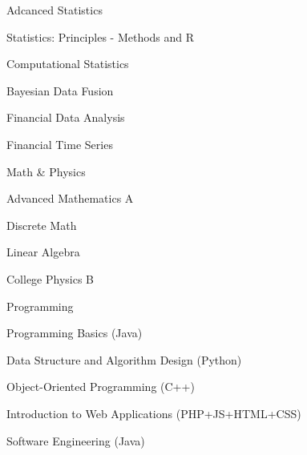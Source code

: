 \begin{cventries}
\cventry
  {Adcanced Statistics} %
  {} %
  {} %
  {} %
  {
    \begin{cvitems} %
      \item {Statistics: Principles - Methods and R}
      \item {Computational Statistics}
      \item {Bayesian Data Fusion}
      \item {Financial Data Analysis}
      \item {Financial Time Series}
    \end{cvitems}
  }

\cventry
  {Math \& Physics} %
  {} %
  {} %
  {} %
  {
    \begin{cvitems} %
      \item {Advanced Mathematics A}
      \item {Discrete Math}
      \item {Linear Algebra}
      \item {College Physics B}
    \end{cvitems}
  }

\cventry
  {Programming} %
  {} %
  {} %
  {} %
  {
    \begin{cvitems} %
      \item {Programming Basics (Java) }
      \item {Data Structure and Algorithm Design (Python)}
      \item {Object-Oriented Programming (C++)}
      \item {Introduction to Web Applications (PHP+JS+HTML+CSS) }
      \item {Software Engineering (Java) }
    \end{cvitems}
  }

\end{cventries}
